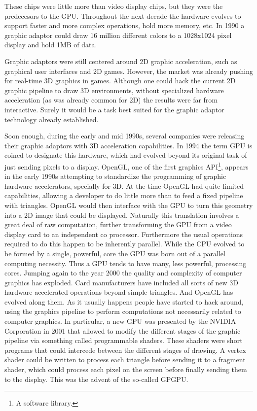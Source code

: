 \documentclass[ twoside,openright,titlepage,numbers=noenddot,%
headinclude,footinclude,cleardoublepage=empty,abstract=on,
BCOR=5mm,paper=a4,fontsize=11pt, dvipsnames
]{scrreprt}
\newcommand{\gpu}{\gls{GPU}\xspace}
\begin{document}
These chips were little more than video display chips, but they were the predecesors to the \gpu.
Throughout the next decade the hardware evolves to support faster and more complex operations, hold more memory, etc. In 1990 a graphic adaptor could draw 16 million different colors to a 1028x1024 pixel display and hold 1MB of data.

Graphic adaptors were still centered around 2D graphic acceleration, such as graphical user interfaces and 2D games. However, the market was already pushing for real-time 3D graphics in games. Although one could hack the current 2D graphic pipeline to draw 3D environments, without specialized hardware acceleration (as was already common for 2D) the results were far from interactive. Surely it would be a task best suited for the graphic adaptor technology already established.

Soon enough, during the early and mid 1990s, several companies were releasing their graphic adaptors with 3D acceleration capabilities. In 1994 the term \gpu is coined to designate this hardware, which had evolved beyond its original task of just sending pixels to a display.
OpenGL\cite{opengl}, one of the first graphics \gls{API}\footnote{A software library.}, appears in the early 1990s attempting to standardize the programming of graphic hardware accelerators, specially for 3D.
At the time OpenGL had quite limited capabilities, allowing a developer to do little more than to feed a fixed pipeline with triangles. OpenGL would then interface with the \gpu to turn this geometry into a 2D image that could be displayed.
Naturally this translation involves a great deal of raw computation, further transforming the \gpu from a video display card to an independent co processor. Furthermore the usual operations required to do this happen to be inherently parallel. While the CPU evolved to be formed by a single, powerful, core the \gpu was born out of a parallel computing necessity. Thus a \gpu tends to have many, less powerful, processing cores.
Jumping again to the year 2000 the quality and complexity of computer graphics has exploded. Card manufacturers have included all sorts of new 3D hardware accelerated operations beyond simple triangles. And OpenGL has evolved along them. As it usually happens people have started to hack around, using the graphics pipeline to perform computations not necessarily related to computer graphics. In particular, a new \gpu was presented by the NVIDIA Corporation in 2001 that allowed to modify the different stages of the graphic pipeline via something called programmable shaders. These shaders were short programs that could intercede between the different stages of drawing. A vertex shader could be written to process each triangle before sending it to a fragment shader, which could process each pixel on the screen before finally sending them to the display. This was the advent of the so-called \gls{GPGPU}.
\end{document}
